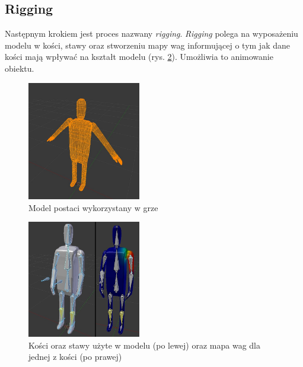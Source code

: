 \documentclass[multip]{SGGW-thesis}
\begin{document}
	\subsection{Rigging}
Następnym krokiem jest proces nazwany {\em rigging}\cite{whats-rigging}. {\em Rigging} polega na wyposażeniu modelu w kości, stawy oraz stworzeniu mapy wag informującej o tym jak dane kości mają wpływać na kształt modelu (rys. \ref{blender-rigging}). Umożliwia to animowanie obiektu.
\begin{figure}
		\centering
			\includegraphics[width=0.44\textwidth]{figures/adimodel.jpg}
		\caption{Model postaci wykorzystany w grze}
		\label{blender-model}
\end{figure}
\begin{figure}
		\centering
			\includegraphics[width=0.44\textwidth]{figures/adirig.jpg}
		\caption{Kości oraz stawy użyte w modelu (po lewej) oraz mapa wag dla jednej z kości (po prawej)}
		\label{blender-rigging}
\end{figure}
\clearpage
\end{document}
